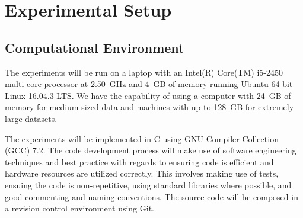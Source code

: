 %
%
%
%   
%
%
\chapter{Experimental Setup} \label{chap:experimentalsetup}
\vspace{-1cm}

\section{Computational Environment}

The experiments will be run on a laptop with an Intel(R) Core(TM) i5-2450 multi-core processor at 2.50~GHz and 4~GB of memory running Ubuntu 64-bit Linux 16.04.3 LTS. We have the capability of using a computer with 24~GB of memory for medium sized data and machines with up to 128~GB for extremely large datasets.

The experiments will be implemented in C using GNU Compiler Collection (GCC) 7.2. The code development process will make use of software engineering techniques and best practice with regards to ensuring code is efficient and hardware resources are utilized correctly. This involves making use of tests, ensuing the code is non-repetitive, using standard libraries where possible, and good commenting and naming conventions. The source code will be composed in a revision control environment using Git.




